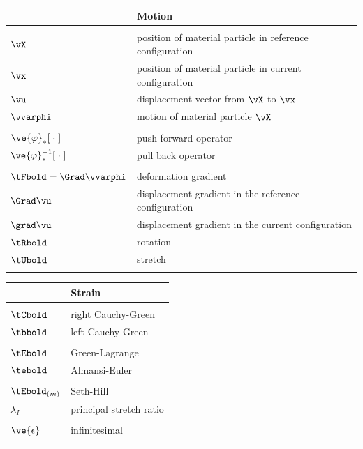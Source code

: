 \noindent \begin{tabular}{ll} \hline
 & {\bf Motion} \\ \hline 
\hspace{0.2\textwidth} & \hspace{0.745\textwidth} \\
$\vX$ & 
position of material particle in reference configuration
\\
$\vx$ & 
position of material particle in current configuration
\\
$\vu$ &
displacement vector from $\vX$ to $\vx$
\\
$\vvarphi$ &
motion of material particle $\vX$ 
\\
& \\
$\ve{\varphi}_*[\;\cdot\;]$ &
push forward operator
\\
$\ve{\varphi}^{-1}_*[\;\cdot\;]$ &
pull back operator
\\
& \\
$\tFbold = \Grad \vvarphi$ &
deformation gradient
\\
$\Grad \vu$ &
displacement gradient in the reference configuration
\\
$\grad \vu$ &
displacement gradient in the current configuration
\\
$\tRbold$ & 
rotation
\\
$\tUbold$ & 
stretch
\\
& \\ \end{tabular}

\noindent \begin{tabular}{ll} \hline
 & {\bf Strain } \\ \hline
\hspace{0.2\textwidth} & \hspace{0.745\textwidth} \\
$\tCbold$ & 
right Cauchy-Green
\\
$\tbbold$ & 
left Cauchy-Green
\\
& \\
$\tEbold$ &
Green-Lagrange
\\
$\tebold$ &
Almansi-Euler
\\
& \\
$\tEbold_{(m)}$ &
Seth-Hill
\\
$\lambda_I$ & 
principal stretch ratio
\\
& \\
$\ve{\epsilon}$ &
infinitesimal
\\
& \\ \end{tabular}

